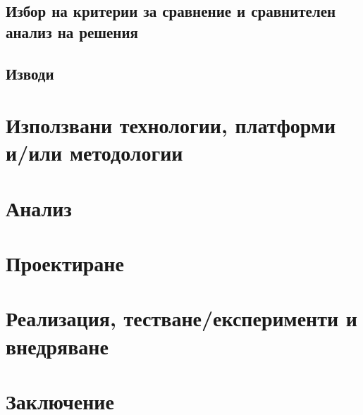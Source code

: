 \documentclass[a4paper,12pt]{article}
\begin{document}
\subsection{Избор на критерии за сравнение и сравнителен анализ на решения}

\subsection{Изводи}

\section{Използвани технологии, платформи и/или методологии}

\section{Анализ}

\section{Проектиране}

\section{Реализация, тестване/експерименти и внедряване}

\section{Заключение}

\printbibliography[title={Използвана литература}]
\end{document}
